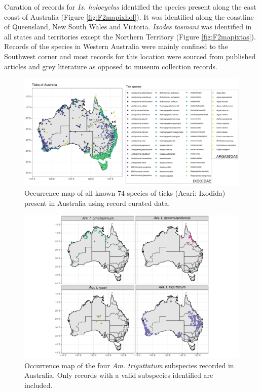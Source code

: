 \documentclass[a4paper, nobind]{templates/ociamthesis}
\begin{document}
Curation of records for \emph{Ix. holocyclus} identified the species present along the east coast of Australia (Figure \ref{fig:F2mapixhol}).
It was identified along the coastline of Queensland, New South Wales and Victoria.
\emph{Ixodes tasmani} was identified in all states and territories except the Northern Territory (Figure \ref{fig:F2mapixtas}).
Records of the species in Western Australia were mainly confined to the Southwest corner and most records for this location were sourced from published articles and grey literature as opposed to museum collection records.

\newpage

\begin{figure}
\includegraphics[width=0.95\linewidth]{figures/ms-figs/Ch2-mapallticks} \caption[Map of tick species present in Australia.]{Occurrence map of all known 74 species of ticks (Acari: Ixodida) present in Australia using record curated data.}\label{fig:F2mapall}
\end{figure}

\newpage

\begin{figure}
\includegraphics[width=0.95\linewidth]{figures/ms-figs/Ch2-amtrisubsp} \caption[Map of \textit{Am. triguttatum} subspecies.]{Occurrence map of the four \textit{Am. triguttatum} subspecies recorded in Australia. Only records with a valid subspecies identified are included.}\label{fig:F2atrigmapsubp}
\end{figure}
\end{document}
